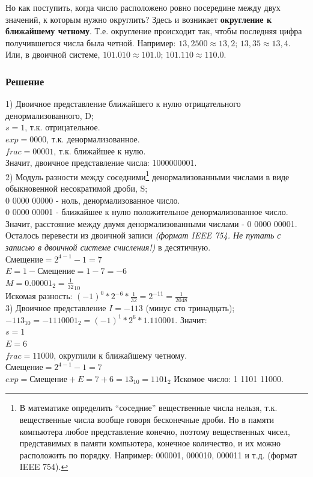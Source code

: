 \documentclass[12pt, letterpaper]{article}
\begin{document}
Но как поступить, когда число расположено ровно посередине между двух значений, к которым нужно округлить? Здесь и возникает \textbf{округление к ближайшему четному}. Т.е. округление происходит так, чтобы последняя цифра получившегося числа была четной. Например: $13,2500\approx13,2$; $13,35\approx13,4$. Или, в двоичной системе, $101.010\approx101.0$; $101.110\approx110.0$.\\

\subsubsection{Решение}
1) Двоичное представление ближайшего к нулю отрицательного денормализованного, D;\\
$s = 1$, т.к. отрицательное.\\
$exp = 0000$, т.к. денормализованное.\\
$frac = 00001$, т.к. ближайшее к нулю.\\
Значит, двоичное представление числа: 1000000001.\\

2) Модуль разности между соседними\footnote{В математике определить ``соседние'' вещественные числа нельзя, т.к. вещественные числа вообще говоря бесконечные дроби. Но в памяти компьютера любое представление конечно, поэтому вещественных чисел, представимых в памяти компьютера, конечное количество, и их можно расположить по порядку. Например: 000001, 000010, 000011 и т.д. (формат IEEE 754).} денормализованными числами в виде
обыкновенной несократимой дроби, S;\\
0 0000 00000 - ноль, денормализованное число.\\
0 0000 00001 - ближайшее к нулю положительное денормализованное число.\\
Значит, расстояние между двумя денормализованными числами - 0 0000 00001. Осталось перевести из двоичной записи \textit{(формат IEEE 754. Не путать с записью в двоичной системе счисления!)} в десятичную.\\
$\text{Смещение} = 2^{4-1} - 1 = 7$\\
$E = 1 - \text{Смещение} = 1 - 7 = -6$\\
$M = 0.00001_2 = \frac{1}{32}_{10}$\\
Искомая разность: $(-1)^0 * 2^{-6} * \frac{1}{32} = 2^{-11} = \frac{1}{2048}$\\

3) Двоичное представление $I=-113$ (минус сто тринадцать);\\
$-113_{10} = -1110001_2 =(-1)^1 * 2^6 * 1.110001$. Значит:\\
$s = 1$\\
$E = 6$\\
$frac = 11000$, округлили к ближайшему четному.\\
$\text{Смещение} = 2^{4-1} - 1 = 7$\\
$exp = \text{Смещение} + E = 7 + 6 = 13_{10} = 1101_2$
Искомое число: 1 1101 11000.\\
\end{document}
